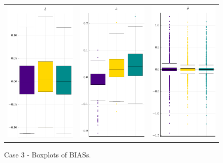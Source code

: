 \begin{figure}[H] 
	
	\centering
	\begin{tabular}[b]{c c c}
		\includegraphics[width=.3\textwidth]{Figures/3/BIAS_b.pdf} & \includegraphics[width=.3\textwidth]{Figures/3/BIAS_a.pdf} & \includegraphics[width=.3\textwidth]{Figures/3/BIAS_t.pdf}
	\end{tabular}
	\caption{Case 3 - Boxplots of BIASs.}
	\label{fig:bpBIAS3}
\end{figure}
